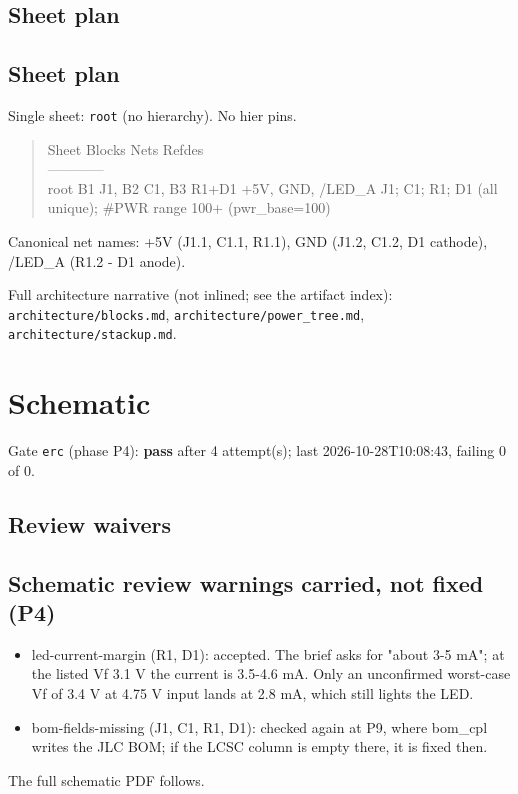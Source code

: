 \documentclass[11pt]{article}
\begin{document}
\subsection*{Sheet plan}
\subsection*{Sheet plan}
Single sheet: \texttt{root} (no hierarchy). No hier pins.

\begin{quote}\small\ttfamily\raggedright
\textbar{} Sheet \textbar{} Blocks \textbar{} Nets \textbar{} Refdes \textbar{}\\
\textbar{}---\textbar{}---\textbar{}---\textbar{}---\textbar{}\\
\textbar{} root \textbar{} B1 J1, B2 C1, B3 R1+D1 \textbar{} +5V, GND, /LED\_A \textbar{} J1; C1; R1; D1 (all unique); \#PWR range 100+ (pwr\_base=100) \textbar{}
\end{quote}
Canonical net names: +5V (J1.1, C1.1, R1.1), GND (J1.2, C1.2, D1 cathode), /LED\_A (R1.2 - D1 anode).

Full architecture narrative (not inlined; see the artifact index): \texttt{architecture/blocks.md}, \texttt{architecture/power\_tree.md}, \texttt{architecture/stackup.md}.
\section{Schematic}
Gate \texttt{erc} (phase P4): \textbf{pass} after 4 attempt(s); last 2026-10-28T10:08:43, failing 0 of 0.
\subsection*{Review waivers}
\subsection*{Schematic review warnings carried, not fixed (P4)}
\begin{itemize}
\item led-current-margin (R1, D1): accepted. The brief asks for "about 3-5 mA";
at the listed Vf 3.1 V the current is 3.5-4.6 mA. Only an unconfirmed worst-case
Vf of 3.4 V at 4.75 V input lands at 2.8 mA, which still lights the LED.
\item bom-fields-missing (J1, C1, R1, D1): checked again at P9, where bom\_cpl
writes the JLC BOM; if the LCSC column is empty there, it is fixed then.
\end{itemize}
The full schematic PDF follows.

\end{document}
